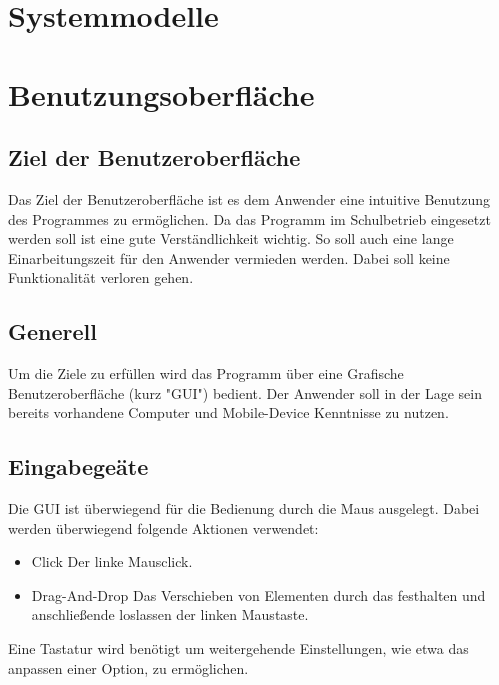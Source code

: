 \documentclass[parskip=full]{scrartcl}
\begin{document}
\section{Systemmodelle}

\section{Benutzungsoberfläche}

\subsection{Ziel der Benutzeroberfläche}

Das Ziel der Benutzeroberfläche ist es dem Anwender eine intuitive Benutzung des Programmes zu ermöglichen. Da das Programm im Schulbetrieb eingesetzt werden soll ist eine gute Verständlichkeit wichtig. So soll auch eine lange Einarbeitungszeit für den Anwender vermieden werden. Dabei soll keine Funktionalität verloren gehen.

\subsection{Generell}

Um die Ziele zu erfüllen wird das Programm über eine Grafische Benutzeroberfläche (kurz "GUI") bedient. Der Anwender soll in der Lage sein bereits vorhandene Computer und Mobile-Device Kenntnisse zu nutzen.

\subsection{Eingabegeäte}

Die GUI ist überwiegend für die Bedienung durch die Maus ausgelegt. Dabei werden überwiegend folgende Aktionen verwendet:

\begin{itemize} 
	\item Click \newline Der linke Mausclick.
	\item Drag-And-Drop \newline Das Verschieben von Elementen durch das festhalten und anschließende loslassen der linken Maustaste.
\end{itemize}

Eine Tastatur wird benötigt um weitergehende Einstellungen, wie etwa das anpassen einer Option, zu ermöglichen.
\end{document}
